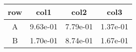 \begin{tabular}{cccc}
\toprule
row&col1&col2&col3\tabularnewline
\midrule
A&9.63e-01&7.79e-01&1.37e-01\tabularnewline
B&1.70e-01&8.74e-01&1.67e-01\tabularnewline
\bottomrule
\end{tabular}
